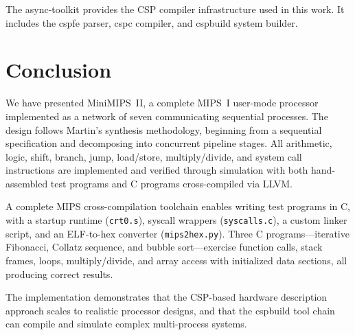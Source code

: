 \documentclass[11pt]{article}
\begin{document}
The async-toolkit \cite{AsyncToolkit} provides the CSP compiler
infrastructure used in this work.  It includes the cspfe parser, cspc compiler,
and cspbuild system builder.

\section{Conclusion}

We have presented MiniMIPS~II, a complete MIPS~I user-mode processor implemented
as a network of seven communicating sequential processes.  The design follows
Martin's synthesis methodology, beginning from a sequential specification and
decomposing into concurrent pipeline stages.  All arithmetic, logic, shift,
branch, jump, load/store, multiply/divide, and system call instructions are
implemented and verified through simulation with both hand-assembled test
programs and C programs cross-compiled via LLVM.

A complete MIPS cross-compilation toolchain enables writing test programs in C,
with a startup runtime (\texttt{crt0.s}), syscall wrappers
(\texttt{syscalls.c}), a custom linker script, and an ELF-to-hex converter
(\texttt{mips2hex.py}).  Three C programs---iterative Fibonacci, Collatz
sequence, and bubble sort---exercise function calls, stack frames, loops,
multiply/divide, and array access with initialized data sections, all
producing correct results.

The implementation demonstrates that the CSP-based hardware description
approach scales to realistic processor designs, and that the cspbuild tool
chain can compile and simulate complex multi-process systems.
\end{document}
